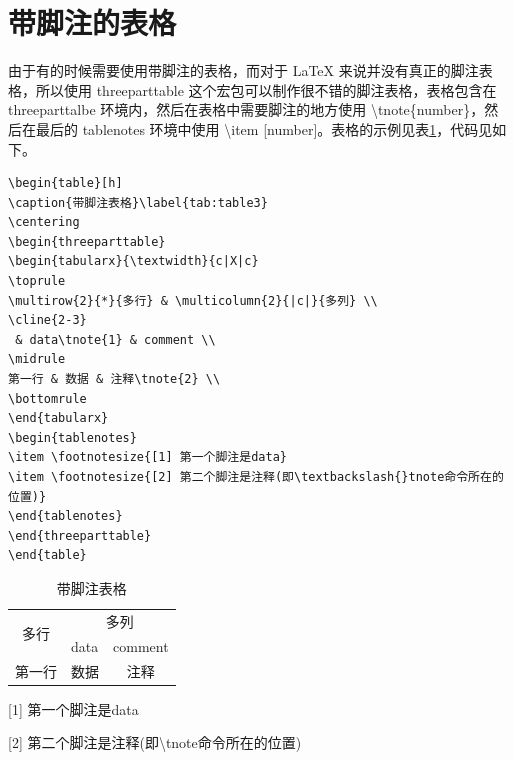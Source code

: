 \documentclass[12pt,openany]{book}
\begin{document}
\section{带脚注的表格}
由于有的时候需要使用带脚注的表格，而对于 \LaTeX{} 来说并没有真正的脚注表格，所以使用 threeparttable 这个宏包可以制作很不错的脚注表格，表格包含在 threeparttalbe 环境内，然后在表格中需要脚注的地方使用 \textbackslash{}tnote\{number\}，然后在最后的 tablenotes 环境中使用 \textbackslash{}item [number]。表格的示例见表\ref{tab:table3}，代码见如下。

\begin{verbatim}
\begin{table}[h]
\caption{带脚注表格}\label{tab:table3}
\centering
\begin{threeparttable}
\begin{tabularx}{\textwidth}{c|X|c}
\toprule
\multirow{2}{*}{多行} & \multicolumn{2}{|c|}{多列} \\
\cline{2-3}
 & data\tnote{1} & comment \\
\midrule
第一行 & 数据 & 注释\tnote{2} \\
\bottomrule
\end{tabularx}
\begin{tablenotes}
\item \footnotesize{[1] 第一个脚注是data}
\item \footnotesize{[2] 第二个脚注是注释(即\textbackslash{}tnote命令所在的位置)}
\end{tablenotes}
\end{threeparttable}
\end{table}
\end{verbatim}

\begin{table}[h]
\caption{带脚注表格}\label{tab:table3}
\centering
\begin{threeparttable}
\begin{tabularx}{\textwidth}{c|X|c}
\toprule
\multirow{2}{*}{多行} & \multicolumn{2}{c}{多列} \\
\cline{2-3}
 & data\tnote{1} & comment \\
\midrule
第一行 & 数据 & 注释\tnote{2} \\
\bottomrule
\end{tabularx}
\begin{tablenotes}
\item \footnotesize{[1] 第一个脚注是data}
\item \footnotesize{[2] 第二个脚注是注释(即\textbackslash{}tnote命令所在的位置)}
\end{tablenotes}
\end{threeparttable}
\end{table}
\end{document}
